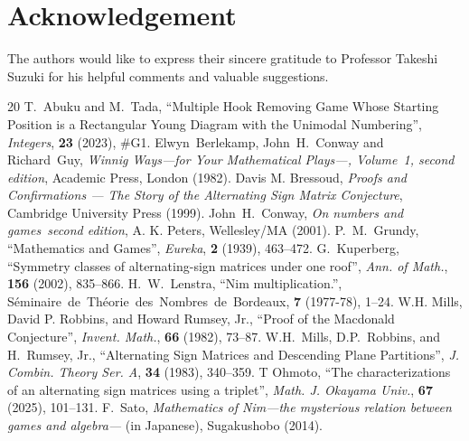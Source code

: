 \documentclass[a4paper,11pt]{amsart}
\theoremstyle{definition}
\numberwithin{equation}{section}
\begin{document}
%
%
%
%
%
\section*{Acknowledgement}
The authors would like to express their sincere gratitude to Professor Takeshi Suzuki 
for his helpful comments and valuable suggestions.
%
%
%
%
%
\begin{thebibliography}{20}
	{T.~Abuku and M.~Tada},
	``Multiple Hook Removing Game Whose
	Starting Position is a Rectangular Young
	Diagram with the Unimodal Numbering'',
	{\em Integers}, {\bf 23} (2023), \#G1.
%
	Elwyn~Berlekamp, John~H.~Conway and Richard~Guy,
	{\em Winnig Ways---for Your Mathematical Plays---, Volume~1, second edition},
	Academic Press, London (1982).
%
Davis M. Bressoud, 
{\em Proofs and Confirmations --- The Story of the Alternating Sign Matrix Conjecture},
Cambridge University Press (1999).
%
John~H.~Conway, 
{\em On numbers and games~second edition}, 
A. K. Peters, Wellesley/MA (2001).
%
P.~M.~Grundy,
``Mathematics and Games'',
{\em Eureka}, {\bf 2} (1939), 463--472.
%
G.~Kuperberg,
``Symmetry classes of alternating-sign matrices under one roof'',
{\em Ann. of Math.}, {\bf 156} (2002), 835--866.
%
%
H.~W.~Lenstra,
``Nim multiplication.'',
S\'{e}minaire~de~Th\'{e}orie~des~Nombres~de~Bordeaux,
{\bf 7} (1977-78), 1--24.
%
W.H. Mills, David P. Robbins, and Howard Rumsey, Jr.,
``Proof of the Macdonald Conjecture'',
{\em Invent. Math.}, {\bf 66} (1982), 73--87.
%
W.H.~Mills, D.P.~Robbins, and H.~Rumsey, Jr.,
``Alternating Sign Matrices and Descending Plane Partitions'',
{\em J. Combin. Theory Ser. A}, {\bf 34} (1983), 340--359.
%
T Ohmoto,
``The characterizations of an alternating sign matrices using a triplet'',
{\em Math. J. Okayama Univ.}, {\bf 67} (2025), 101--131.
%
F.~Sato,
\textit{Mathematics of Nim---the mysterious relation between games and algebra---}
(in Japanese),
Sugakushobo (2014).
%

\end{thebibliography}
\end{document}
